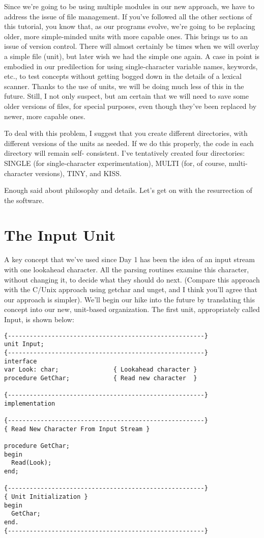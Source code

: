 Since we're going to be using multiple modules in our new approach, we have to address the issue of file management. If you've followed all the other sections of this tutorial, you know that, as our programs evolve, we're going to be replacing older, more simple-minded units with more capable ones. This brings us to an issue of version control. There will almost certainly be times when we will overlay a simple file (unit), but later wish we had the simple one again. A case in point is embodied in our predilection for using single-character variable names, keywords, etc., to test concepts without getting bogged down in the details of a lexical scanner. Thanks to the use of units, we will be doing much less of this in the future. Still, I not only suspect, but am certain that we will need to save some older versions of files, for special purposes, even though they've been replaced by newer, more capable ones.

To deal with this problem, I suggest that you create different directories, with different versions of the units as needed. If we do this properly, the code in each directory will remain self- consistent. I've tentatively created four directories:  SINGLE (for single-character experimentation), MULTI (for, of course, multi-character versions), TINY, and KISS.

Enough said about philosophy and details. Let's get on with the resurrection of the software.

\section{The Input Unit}

A key concept that we've used since Day 1 has been the idea of an input stream with one lookahead character. All the parsing routines examine this character, without changing it, to decide what they should do next. (Compare this approach with the C/Unix approach using getchar and unget, and I think you'll agree that our approach is simpler). We'll begin our hike into the future by translating this concept into our new, unit-based organization. The first unit, appropriately called Input, is shown below:

\begin{verbatim}
{------------------------------------------------------}
unit Input;
{------------------------------------------------------}
interface
var Look: char;               { Lookahead character }
procedure GetChar;            { Read new character  }

{------------------------------------------------------}
implementation

{------------------------------------------------------}
{ Read New Character From Input Stream }

procedure GetChar;
begin
  Read(Look);
end;

{------------------------------------------------------}
{ Unit Initialization }
begin
  GetChar;
end.
{------------------------------------------------------}
\end{verbatim}

